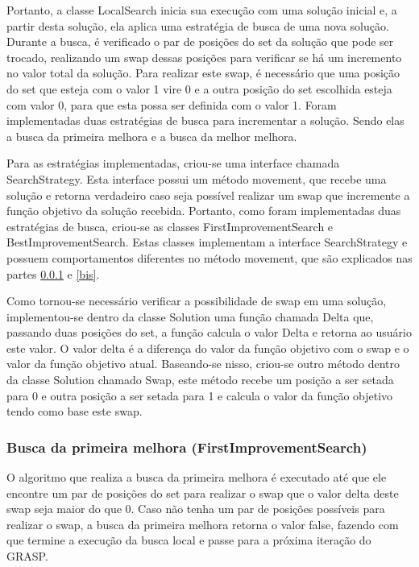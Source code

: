 \documentclass[12pt]{article}
\begin{document}
Portanto, a classe LocalSearch inicia sua execução com uma solução inicial e, a partir desta solução, ela aplica uma estratégia de busca de uma nova solução. Durante a busca, é verificado o par de posições do set da solução que pode ser trocado, realizando um swap dessas posições para verificar se há um incremento no valor total da solução. Para realizar este swap, é necessário que uma posição do set que esteja com o valor 1 vire 0 e a outra posição do set escolhida esteja com valor 0, para que esta possa ser definida com o valor 1. Foram implementadas duas estratégias de busca para incrementar a solução. Sendo elas a busca da primeira melhora e a busca da melhor melhora.

Para as estratégias implementadas, criou-se uma interface chamada SearchStrategy. Esta interface possui um método movement, que recebe uma solução e retorna verdadeiro caso seja possível realizar um swap que incremente a função objetivo da solução recebida. Portanto, como foram implementadas duas estratégias de busca, criou-se as classes FirstImprovementSearch e BestImprovementSearch. Estas classes implementam a interface SearchStrategy e possuem comportamentos diferentes no método movement, que são explicados nas partes \ref{fis} e \ref{bis}.

Como tornou-se necessário verificar a possibilidade de swap em uma solução, implementou-se dentro da classe Solution uma função chamada Delta que, passando duas posições do set, a função calcula o valor Delta e retorna ao usuário este valor. O valor delta é a diferença do valor da função objetivo com o swap e o valor da função objetivo atual. Baseando-se nisso, criou-se outro método dentro da classe Solution chamado Swap, este método recebe um posição a ser setada para 0 e outra posição a ser setada para 1 e calcula o valor da função objetivo tendo como base este swap.

\subsubsection{Busca da primeira melhora (FirstImprovementSearch)}\label{fis}
O algoritmo que realiza a busca da primeira melhora é executado até que ele encontre um par de posições do set para realizar o swap que o valor delta deste swap seja maior do que 0. Caso não tenha um par de posições possíveis para realizar o swap, a busca da primeira melhora retorna o valor false, fazendo com que termine a execução da busca local e passe para a próxima iteração do GRASP.
\end{document}
